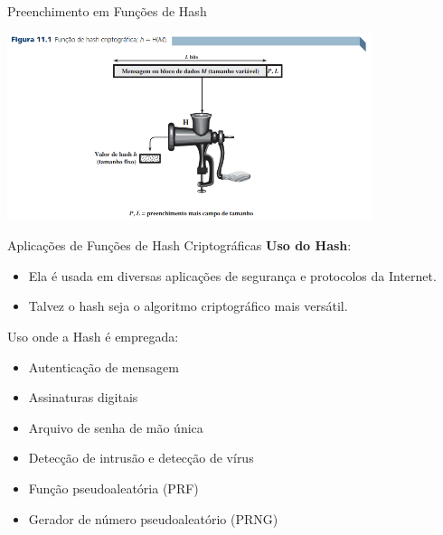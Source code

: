 \begin{frame}{Preenchimento em Funções de Hash}

    \begin{center}
        \includegraphics[width=0.8\textwidth]{Figuras/Hash-moedor.png}
    \end{center}
\end{frame}



\begin{frame}{Aplicações de Funções de Hash Criptográficas}
    \textbf{Uso do Hash}:

    \begin{itemize}
        \item Ela é usada em diversas aplicações de segurança e protocolos da Internet.
        \item Talvez o hash seja o algoritmo criptográfico mais versátil.

    \end{itemize}

    \medskip
    Uso onde a Hash é empregada:

    \begin{itemize}
        \item Autenticação de mensagem
        \item Assinaturas digitais
        \item Arquivo de senha de mão única
        \item Detecção de intrusão e detecção de vírus
        \item Função pseudoaleatória (PRF)
        \item Gerador de número pseudoaleatório (PRNG)
    \end{itemize}
\end{frame}


